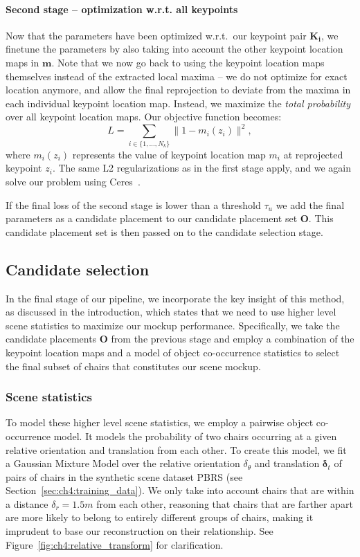 \documentclass[10pt,twocolumn,letterpaper]{article}
\newcommand{\bb}[1]{{\bm{#1}}}
\begin{document}
\paragraph{Second stage -- optimization w.r.t. all keypoints}
Now that the parameters have been optimized w.r.t.\ our keypoint pair $\bb{K_i}$, we 
finetune the parameters by also taking into account the other keypoint location maps in $\bb{m}$.
Note that we now go back to using the keypoint location maps themselves instead
of the extracted local maxima -- we do not optimize for exact location anymore, and
allow the final reprojection to deviate from the maxima in each individual keypoint location map.
Instead, we maximize the \emph{total probability} over all keypoint location maps. Our objective function  becomes:
%
\[ L = \sum_{i \in \{1, \ldots, N_k\}} \|1 - m_i(z_i)\|^2, \]
%
where $m_i(z_i)$ represents the value of keypoint location map $m_i$ at reprojected keypoint $z_i$.
The same L2 regularizations as in the first stage apply, and we again solve our problem using Ceres~\cite{Ceres}.

If the final loss of the second stage is lower than a threshold $\tau_u$ we add the final parameters
as a candidate placement to our candidate placement set $\bb{O}$. This candidate placement set
is then passed on to the candidate selection stage.

\subsection{Candidate selection}
\label{sec:ch4:optimization}
In the final stage of our pipeline, we incorporate the key insight of this
method, as discussed in the introduction, which states that we need to use higher level
scene statistics to maximize our mockup performance.  Specifically, we take the
candidate placements $\bb{O}$ from the previous stage and employ a
combination of the keypoint location maps and a model of object co-occurrence
statistics to select the final subset of chairs that constitutes our scene
mockup.

\subsubsection{Scene statistics}
\label{ssec:ch4:scene_statistics}
To model these higher level scene statistics, we employ a pairwise object
co-occurrence model. It models the probability of two chairs occurring at a given
relative orientation and translation from each other.  To create this model, we
fit a Gaussian Mixture Model over the relative orientation $\delta_\theta$ and translation $\bb{\delta}_t$ of
pairs of chairs in the synthetic scene dataset \textsc{PBRS} (see
Section~\ref{sec:ch4:training_data}). We only take into account chairs that
are within a distance $\delta_r = 1.5m$ from each other, reasoning that chairs
that are farther apart are more likely to belong to entirely different groups
of chairs, making it imprudent to base our reconstruction on their
relationship. See Figure~\ref{fig:ch4:relative_transform} for clarification.
\end{document}
